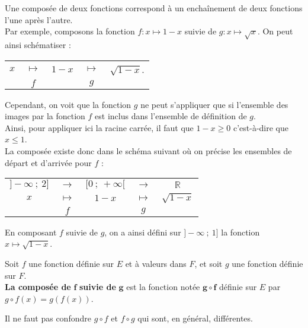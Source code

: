 \documentclass{cornouaille}
\begin{document}
Une composée de deux fonctions correspond à un enchaînement de deux fonctions l'une après l'autre.\\
Par exemple, composons la fonction $f:x\mapsto1-x$ suivie de $g:x\mapsto\sqrt{x}$. On peut ainsi schématiser :
\begin{center}\renewcommand{\arraystretch}{0.7}
\begin{tabular}{c@{}c@{}c@{}c@{}c}
$x$ & $\,\mapsto\,$ & $1-x$ & $\,\mapsto\,$ & $\sqrt{1-x}$. \\
 & $f$ & &  $g$ &
\end{tabular}\renewcommand{\arraystretch}{1.}
\end{center}
Cependant, on voit que la fonction $g$ ne peut s'appliquer que si l'ensemble des images par la fonction $f$ est inclus dans l'ensemble de définition de $g$.\\
Ainsi, pour appliquer ici la racine carrée, il faut que $1-x\geqslant0$ c'est-à-dire que $x\leqslant1$.\\
La composée existe donc dans le schéma suivant où on précise les ensembles de départ et d'arrivée pour $f$ :
\begin{center}\renewcommand{\arraystretch}{0.7}
\begin{tabular}{c@{}c@{}c@{}c@{}c}
$]-\infty~;~2]$ & $\rightarrow$ & $[0~;~+\infty[$ &  $\rightarrow$ & $\mathbb{R}$ \\
$x$ & $\,\mapsto\,$ & $1-x$ & $\,\mapsto\,$ & $\sqrt{1-x}$ \\
 & $f$ & &  $g$ & \\
\end{tabular}\renewcommand{\arraystretch}{1.}
\end{center}
En composant $f$ suivie de $g$, on a ainsi défini sur $]-\infty~;~1]$ la fonction $x\mapsto\sqrt{1-x}$.\\


\begin{definition}
Soit $f$ une fonction définie sur $E$ et à valeurs dans  $F$, et soit $g$ une fonction définie sur $F$.\\
\textbf{La composée de} $\boldsymbol{f}$ \textbf{suivie de} $\boldsymbol{g}$ est la fonction notée $\boldsymbol{g\circ f}$ définie sur $E$ par $g\circ f(x)=g(f(x))$.
\end{definition}

\begin{remarque}
Il ne faut pas confondre $g\circ f$ et $f\circ g$ qui sont, en général, différentes.
\end{remarque}
\end{document}
